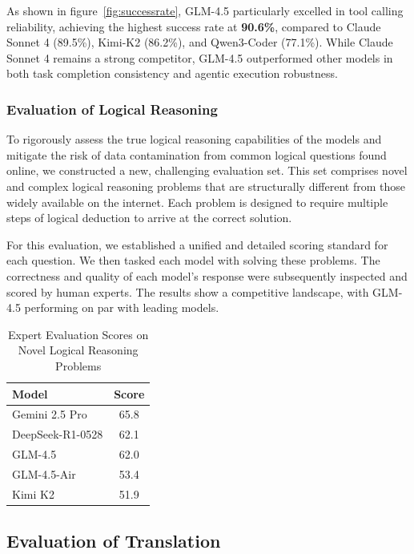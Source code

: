 As shown in figure~\ref{fig:successrate}, GLM-4.5 particularly excelled in tool calling reliability, achieving the highest success rate at \textbf{90.6\%}, compared to Claude Sonnet 4 (89.5\%), Kimi-K2 (86.2\%), and Qwen3-Coder (77.1\%). While Claude Sonnet 4 remains a strong competitor, GLM-4.5 outperformed other models in both task completion consistency and agentic execution robustness.

\subsubsection{Evaluation of Logical Reasoning}
To rigorously assess the true logical reasoning capabilities of the models and mitigate the risk of data contamination from common logical questions found online, we constructed a new, challenging evaluation set. This set comprises novel and complex logical reasoning problems that are structurally different from those widely available on the internet. Each problem is designed to require multiple steps of logical deduction to arrive at the correct solution.

For this evaluation, we established a unified and detailed scoring standard for each question. We then tasked each model with solving these problems. The correctness and quality of each model's response were subsequently inspected and scored by human experts. The results show a competitive landscape, with GLM-4.5 performing on par with leading models.

\begin{table}[!h]
\centering
\caption{Expert Evaluation Scores on Novel Logical Reasoning Problems}
\label{tab:logic-reasoning-results}
\begin{tabular}{lc}
\toprule
\textbf{Model} & \textbf{Score} \\
\midrule
Gemini 2.5 Pro & 65.8 \\
DeepSeek-R1-0528 & 62.1 \\
GLM-4.5 & 62.0 \\
GLM-4.5-Air & 53.4 \\
Kimi K2 & 51.9 \\
\bottomrule
\end{tabular}
\end{table}



\subsection{Evaluation of Translation}

